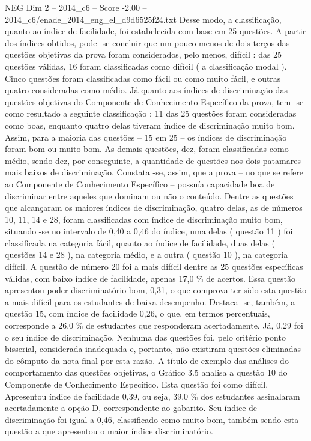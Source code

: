 \begin{textsample}{NEG Dim 2 – 2014\_c6 – Score -2.00 – 2014\_c6/enade\_2014\_eng\_el\_d9d6525f24.txt}
Desse modo, a classificação, quanto ao índice de facilidade, foi estabelecida com base em 25 questões.
A partir dos índices obtidos, pode -se concluir que um pouco menos de dois terços das questões objetivas da prova foram considerados, pelo menos, difícil : das 25 questões válidas, 16 foram classificadas como difícil ( a classificação modal ).
Cinco questões foram classificadas como fácil ou como muito fácil, e outras quatro consideradas como médio.
Já quanto aos índices de discriminação das questões objetivas do Componente de Conhecimento Específico da prova, tem -se como resultado a seguinte classificação : 11 das 25 questões foram consideradas como boas, enquanto quatro delas tiveram índice de discriminação muito bom.
Assim, para a maioria das questões – 15 em 25 – os índices de discriminação foram bom ou muito bom.
As demais questões, dez, foram classificadas como médio, sendo dez, por conseguinte, a quantidade de questões nos dois patamares mais baixos de discriminação.
Constata -se, assim, que a prova – no que se refere ao Componente de Conhecimento Específico – possuía capacidade boa de discriminar entre aqueles que dominam ou não o conteúdo.
Dentre as questões que alcançaram os maiores índices de discriminação, quatro delas, as de números 10, 11, 14 e 28, foram classificadas com índice de discriminação muito bom, situando -se no intervalo de 0,40 a 0,46 do índice, uma delas ( questão 11 ) foi classificada na categoria fácil, quanto ao índice de facilidade, duas delas ( questões 14 e 28 ), na categoria médio, e a outra ( questão 10 ), na categoria difícil.
A questão de número 20 foi a mais difícil dentre as 25 questões específicas válidas, com baixo índice de facilidade, apenas 17,0 \% de acertos.
Essa questão apresentou poder discriminatório bom, 0,31, o que comprova ter sido esta questão a mais difícil para os estudantes de baixa desempenho.
Destaca -se, também, a questão 15, com índice de facilidade 0,26, o que, em termos percentuais, corresponde a 26,0 \% de estudantes que responderam acertadamente.
Já, 0,29 foi o seu índice de discriminação.
Nenhuma das questões foi, pelo critério ponto bisserial, considerada inadequada e, portanto, não existiram questões eliminadas do cômputo da nota final por esta razão.
A título de exemplo das análises do comportamento das questões objetivas, o Gráfico 3.5 analisa a questão 10 do Componente de Conhecimento Específico.
Esta questão foi como difícil.
Apresentou índice de facilidade 0,39, ou seja, 39,0 \% dos estudantes assinalaram acertadamente a opção D, correspondente ao gabarito.
Seu índice de discriminação foi igual a 0,46, classificado como muito bom, também sendo esta questão a que apresentou o maior índice discriminatório.

\end{textsample}
